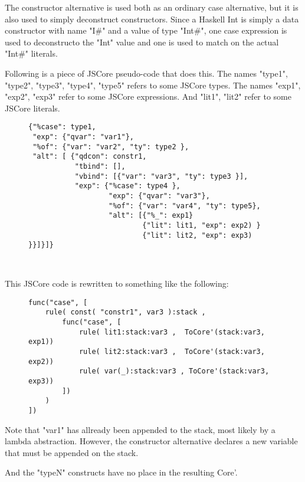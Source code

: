 The constructor alternative is used both as an ordinary case alternative, but it is
also used to simply deconstruct constructors. Since a Haskell Int is simply a data
constructor with name "I\#" and a value of type "Int\#", one case expression is used 
to deconstructo the "Int" value and one is used to match on the actual "Int\#" literals.


Following is a piece of JSCore pseudo-code that does this. 
The names "type1", "type2", "type3", "type4", "type5" refers to some JSCore types. 
The names "exp1", "exp2", "exp3" refer to some JSCore expressions. And "lit1", "lit2" refer
to some JSCore literals.

\begin{figure}[H]
\lstset{ %
language=Haskell,
caption=JSCore case expression,
label=lst:int1
}
\begin{lstlisting}
{"%case": type1,
 "exp": {"qvar": "var1"},
 "%of": {"var": "var2", "ty": type2 },
 "alt": [ {"qdcon": constr1,
           "tbind": [],
           "vbind": [{"var": "var3", "ty": type3 }],
           "exp": {"%case": type4 },
                   "exp": {"qvar": "var3"},
                   "%of": {"var": "var4", "ty": type5},
                   "alt": [{"%_": exp1}
                           {"lit": lit1, "exp": exp2) }
                           {"lit": lit2, "exp": exp3) }}]}]}



\end{lstlisting}
\end{figure}

This JSCore code is rewritten to something like the following:

\begin{figure}[H]
\lstset{ %
language=Haskell,
caption=JSCore case expression in Core',
label=lst:int1
}
\begin{lstlisting}
func("case", [
    rule( const( "constr1", var3 ):stack ,
        func("case", [  
            rule( lit1:stack:var3 ,  ToCore'(stack:var3, exp1))
            rule( lit2:stack:var3 ,  ToCore'(stack:var3, exp2))
            rule( var(_):stack:var3 , ToCore'(stack:var3, exp3))
        ])
    )
])
\end{lstlisting}
\end{figure}

Note that "var1" has allready
been appended to the stack, most likely by a lambda abstraction. However, the constructor
alternative declares a new variable that must be appended on the stack.

And the "typeN" constructs have no place in the resulting Core'.

